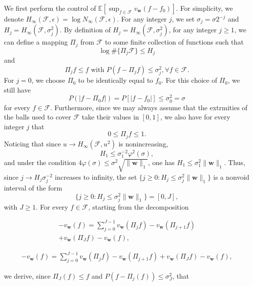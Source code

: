 \documentclass[letterpaper]{article} %
\def\DoubleColumn{}
\def\DoubleColumnEnd{}
\def\SingleColumn{}
\def\SingleColumnEnd{}
\newcommand{\E}{\mathbb{E}}
\newcommand{\weight}{\mathbf{w}}
\newcommand{\normo}[1]{\|#1\|_1}
\begin{document}
    We first perform the control of $\E[\sup_{f\in\mathcal{F}}v_\weight(f-f_0)]$. For simplicity, we denote $H_\infty(\mathcal{F}, \epsilon)=\log N_\infty(\mathcal{F},\epsilon)$. For any integer $j$, we set $\sigma_j=\sigma2^{-j}$ and $H_j=H_\infty(\mathcal{F},\sigma_j^2)$. By definition of $H_j=H_\infty(\mathcal{F},\sigma_j^2)$, for any integer $j\ge 1$, we can define a mapping $\Pi_j$ from $\mathcal{F}$ to some finite collection of functions such that
    \begin{equation}
        \label{eq:bounded_entropy_mapping}
        \log \#\{\Pi_j\mathcal{F}\}\le H_j
    \end{equation}
    and
    \begin{equation}
        \label{eq:bounded_entropy_condition}
        \Pi_jf\le f \text{ with }P(f-\Pi_jf)\le \sigma_j^2, \forall f\in\mathcal{F}.
    \end{equation}
    For $j=0$, we choose $\Pi_0$ to be identically equal to $f_0$. For this choice of $\Pi_0$, we still have
    \begin{equation}
        \label{eq:bounded_entropy_f0}
        P(|f-\Pi_0f|)=P[|f-f_0|]\le \sigma_0^2=\sigma
    \end{equation}
    for every $f\in\mathcal{F}$. Furthermore, since we may always assume that the extrmities of the balls used to cover $\mathcal{F}$ take their values in $[0,1]$, we also have for every integer $j$ that
    \[0\le\Pi_jf\le1.\]
    Noticing that since $u\to H_\infty(\mathcal{F},u^2)$ is nonincreasing,
    \[H_1\le \sigma_1^{-2}\varphi^2(\sigma),\]
    and under the condition $4\varphi(\sigma)\le \sigma^2\sqrt{\normo{\weight{}}}$, one has $H_1\le \sigma_1^2\normo{\weight{}}$. Thus, since $j\to H_j\sigma_j^{-2}$ increases to infinity, the set $\{j\ge 0: H_j\le \sigma_j^2\normo{\weight{}}\}$ is a nonvoid interval of the form
    \[\{j\ge 0: H_j\le \sigma_j^2\normo{\weight{}}\}=[0,J],\]
    with $J\ge 1$. For every $f\in\mathcal{F}$, starting from the decomposition
    \DoubleColumn
    \begin{align*}
    -v_\weight(f)=\sum_{j=0}^{J-1}v_\weight(\Pi_jf)-v_\weight(\Pi_{j+1}f)\\
    +v_\weight(\Pi_Jf)-v_\weight(f),
    \end{align*}
    \DoubleColumnEnd
    \SingleColumn
    \begin{align*}
    -v_\weight(f)=\sum_{j=0}^{J-1}v_\weight(\Pi_jf)-v_\weight(\Pi_{j+1}f)+v_\weight(\Pi_Jf)-v_\weight(f),
    \end{align*}
    \SingleColumnEnd
    we derive, since $\Pi_J(f)\le f$ and $P(f-\Pi_j(f))\le \sigma_J^2$, that
\end{document}
